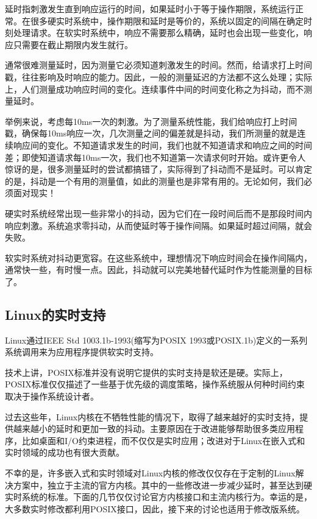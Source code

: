   延时指刺激发生直到响应运行的时间，如果延时小于等于操作期限，系统运行正常。在很多硬实时系统中，操作期限和延时是等价的，系统以固定的间隔在确定时刻处理请求。在软实时系统中，响应不需要那么精确，延时也会出现一些变化，响应只需要在截止期限内发生就行。

  通常很难测量延时，因为测量它必须知道刺激发生的时间。然而，给请求打上时间戳，往往影响及时响应的能力。因此，一般的测量延迟的方法都不这么处理；实际上，人们测量成功响应时间的变化。连续事件中间的时间变化称之为抖动，而不测量延时。

  举例来说，考虑每10ms一次的刺激。为了测量系统性能，我们给响应打上时间戳，确保每10ms响应一次，几次测量之间的偏差就是抖动，我们所测量的就是连续响应间的变化。不知道请求发生的时间，我们也就不知道请求和响应之间的时间差；即使知道请求每10ms一次，我们也不知道第一次请求何时开始。或许更令人惊讶的是，很多测量延时的尝试都搞错了，实际得到了抖动而不是延时。可以肯定的是，抖动是一个有用的测量值，如此的测量也是非常有用的。无论如何，我们必须面对现实！

  硬实时系统经常出现一些非常小的抖动，因为它们在一段时间后而不是那段时间内响应刺激。系统追求零抖动，从而使延时等于操作间隔。如果延时超过间隔，就会失败。

  软实时系统对抖动更宽容。在这些系统中，理想情况下响应时间会在操作间隔内，通常快一些，有时慢一点。因此，抖动就可以完美地替代延时作为性能测量的目标了。

\subsection{Linux的实时支持}

  Linux通过IEEE Std 1003.1b-1993(缩写为POSIX 1993或POSIX.1b)定义的一系列系统调用来为应用程序提供软实时支持。

  技术上讲，POSIX标准并没有说明它提供的实时支持是软还是硬。实际上，POSIX标准仅仅描述了一些基于优先级的调度策略，操作系统服从何种时间约束取决于操作系统设计者。

  过去这些年，Linux内核在不牺牲性能的情况下，取得了越来越好的实时支持，提供越来越小的延时和更加一致的抖动。主要原因在于改进能够帮助很多类应用程序，比如桌面和I/O约束进程，而不仅仅是实时应用；改进对于Linux在嵌入式和实时领域的成功也有很大贡献。

  不幸的是，许多嵌入式和实时领域对Linux内核的修改仅仅存在于定制的Linux解决方案中，独立于主流的官方内核。其中的一些修改进一步减少延时，甚至达到硬实时系统的标准。下面的几节仅仅讨论官方内核接口和主流内核行为。幸运的是，大多数实时修改都利用POSIX接口，因此，接下来的讨论也适用于修改版系统。


